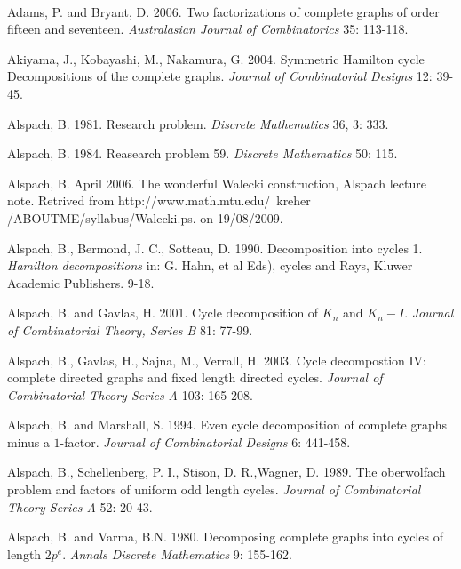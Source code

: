 \documentclass[12pt]{report}
\begin{document}
\begin{newpage}
\baselineskip 18pt \vskip 2.0cm
\\
\begin{description}
\item Adams, P. and  Bryant, D. 2006. Two factorizations of complete
graphs of order fifteen and seventeen. {\it Australasian Journal
of Combinatorics} 35: 113-118.
\item Akiyama, J., Kobayashi, M., Nakamura, G. 2004. Symmetric Hamilton
cycle Decompositions of the complete graphs. {\it Journal of Combinatorial Designs} 12: 39-45.
\item Alspach, B. 1981. Research problem. {\it Discrete Mathematics} 36, 3: 333.
\item Alspach, B. 1984. Reasearch problem 59. {\it Discrete Mathematics} 50: 115.
\item Alspach, B. April 2006. The wonderful Walecki construction, Alspach
lecture note. Retrived from
http://www.math.mtu.edu/~kreher\\/ABOUTME/syllabus/Walecki.ps. on 19/08/2009.
\item Alspach, B., Bermond, J. C.,  Sotteau, D. 1990. Decomposition into
cycles 1. {\it Hamilton decompositions} in: G. Hahn, et al
Eds), cycles and Rays, Kluwer Academic Publishers. 9-18.
\item Alspach, B. and Gavlas, H. 2001. Cycle decomposition of $K_n$ and
$K_n-I$. {\it Journal of Combinatorial Theory, Series B} 81: 77-99.
\item Alspach, B., Gavlas, H., Sajna, M., Verrall, H. 2003. Cycle
decompostion IV: complete directed graphs and fixed length
directed cycles. {\it Journal of Combinatorial Theory Series A} 103: 165-208.
\item Alspach, B. and Marshall, S. 1994. Even cycle decomposition of
complete graphs minus a $1$-factor. {\it Journal of Combinatorial Designs } 6:
441-458.
\item Alspach, B., Schellenberg, P. I., Stison, D. R.,Wagner, D. 1989. The
oberwolfach problem and factors of uniform odd length cycles.
{\it Journal of Combinatorial Theory Series A} 52: 20-43.
\item Alspach, B. and Varma, B.N. 1980. Decomposing complete graphs into cycles of length $2p^e$. {\it Annals Discrete Mathematics} 9: 155-162.

\end{description}
\end{newpage}
\end{document}
